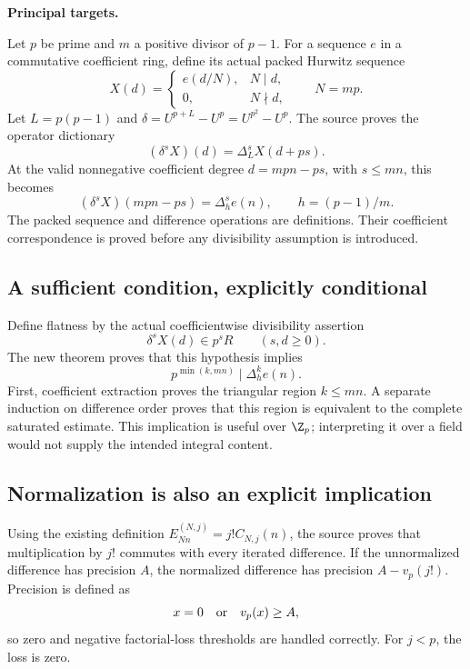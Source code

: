 \textbf{Principal targets.}\par
{}\par
{}\par
{}\par
{}\par
{}

\par\medskip
{}
Let $p$ be prime and $m$ a positive divisor of $p-1$. For a sequence $e$ in a commutative coefficient ring, define its actual packed Hurwitz sequence
\[
 X(d)=\begin{cases}e(d/N),&N\mid d,\\0,&N\nmid d,\end{cases}
 \qquad N=mp.
\]
Let $L=p(p-1)$ and $\delta=U^{p+L}-U^p=U^{p^2}-U^p$. The source proves the operator dictionary
\[
 (\delta^sX)(d)=\Delta_L^s X(d+ps).
\]
At the valid nonnegative coefficient degree $d=mpn-ps$, with $s\le mn$, this becomes
\[
 (\delta^sX)(mpn-ps)=\Delta_h^s e(n),\qquad h=(p-1)/m.
\]
The packed sequence and difference operations are definitions. Their coefficient correspondence is proved before any divisibility assumption is introduced.

\subsection*{A sufficient condition, explicitly conditional}
Define flatness by the actual coefficientwise divisibility assertion
\[
 \delta^sX(d)\in p^sR\qquad(s,d\ge0).
\]
The new theorem proves that this hypothesis implies
\[
 \boxed{p^{\min(k,mn)}\mid\Delta_h^k e(n).}
\]
First, coefficient extraction proves the triangular region $k\le mn$. A separate induction on difference order proves that this region is equivalent to the complete saturated estimate. This implication is useful over $\Z_p$; interpreting it over a field would not supply the intended integral content.

\subsection*{Normalization is also an explicit implication}
Using the existing definition $E^{(N,j)}_{Nn}=j!C_{N,j}(n)$, the source proves that multiplication by $j!$ commutes with every iterated difference. If the unnormalized difference has precision $A$, the normalized difference has precision $A-v_p(j!)$. Precision is defined as
\[
 x=0\quad\hbox{or}\quad v_p(x)\ge A,
\]
so zero and negative factorial-loss thresholds are handled correctly. For $j<p$, the loss is zero.

